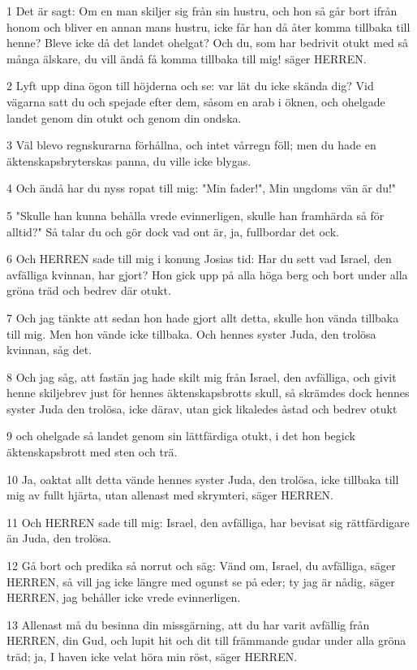 \par 1 Det är sagt: Om en man skiljer sig från sin hustru, och hon så går bort ifrån honom och bliver en annan mans hustru, icke får han då åter komma tillbaka till henne? Bleve icke då det landet ohelgat? Och du, som har bedrivit otukt med så många älskare, du vill ändå få komma tillbaka till mig! säger HERREN.
\par 2 Lyft upp dina ögon till höjderna och se: var lät du icke skända dig? Vid vägarna satt du och spejade efter dem, såsom en arab i öknen, och ohelgade landet genom din otukt och genom din ondska.
\par 3 Väl blevo regnskurarna förhållna, och intet vårregn föll; men du hade en äktenskapsbryterskas panna, du ville icke blygas.
\par 4 Och ändå har du nyss ropat till mig: "Min fader!", Min ungdoms vän är du!"
\par 5 "Skulle han kunna behålla vrede evinnerligen, skulle han framhärda så för alltid?" Så talar du och gör dock vad ont är, ja, fullbordar det ock.
\par 6 Och HERREN sade till mig i konung Josias tid: Har du sett vad Israel, den avfälliga kvinnan, har gjort? Hon gick upp på alla höga berg och bort under alla gröna träd och bedrev där otukt.
\par 7 Och jag tänkte att sedan hon hade gjort allt detta, skulle hon vända tillbaka till mig. Men hon vände icke tillbaka. Och hennes syster Juda, den trolösa kvinnan, såg det.
\par 8 Och jag såg, att fastän jag hade skilt mig från Israel, den avfälliga, och givit henne skiljebrev just för hennes äktenskapsbrotts skull, så skrämdes dock hennes syster Juda den trolösa, icke därav, utan gick likaledes åstad och bedrev otukt
\par 9 och ohelgade så landet genom sin lättfärdiga otukt, i det hon begick äktenskapsbrott med sten och trä.
\par 10 Ja, oaktat allt detta vände hennes syster Juda, den trolösa, icke tillbaka till mig av fullt hjärta, utan allenast med skrymteri, säger HERREN.
\par 11 Och HERREN sade till mig: Israel, den avfälliga, har bevisat sig rättfärdigare än Juda, den trolösa.
\par 12 Gå bort och predika så norrut och säg: Vänd om, Israel, du avfälliga, säger HERREN, så vill jag icke längre med ogunst se på eder; ty jag är nådig, säger HERREN, jag behåller icke vrede evinnerligen.
\par 13 Allenast må du besinna din missgärning, att du har varit avfällig från HERREN, din Gud, och lupit hit och dit till främmande gudar under alla gröna träd; ja, I haven icke velat höra min röst, säger HERREN.
